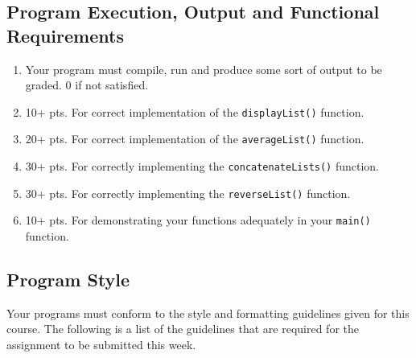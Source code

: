 \documentclass[11pt]{article}
\begin{document}
\subsection*{Program Execution, Output and Functional Requirements}
\label{sec-5-1}


\begin{enumerate}
\item Your program must compile, run and produce some sort of output to
   be graded. 0 if not satisfied.
\item 10+ pts. For correct implementation of the \verb~displayList()~ function.
\item 20+ pts. For correct implementation of the \verb~averageList()~ function.
\item 30+ pts. For correctly implementing the \verb~concatenateLists()~ function.
\item 30+ pts. For correctly implementing the \verb~reverseList()~ function.
\item 10+ pts. For demonstrating your functions adequately in your \verb~main()~ function.
\end{enumerate}
\subsection*{Program Style}
\label{sec-5-2}


Your programs must conform to the style and formatting guidelines
given for this course.  The following is a list of the guidelines that
are required for the assignment to be submitted this week.
\end{document}

